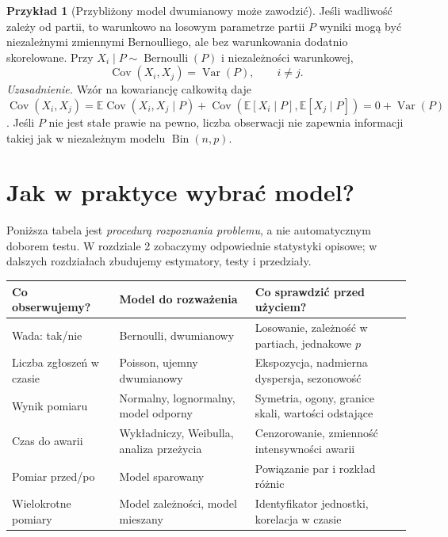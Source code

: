 \documentclass[11pt,a4paper,oneside]{report}
\numberwithin{equation}{chapter}
\theoremstyle{plain}
\theoremstyle{definition}
\newtheorem{przyklad}{Przykład}[chapter]
\theoremstyle{remark}
\newcommand{\E}{\mathbb E}
\newcommand{\Var}{\operatorname{Var}}
\newcommand{\Cov}{\operatorname{Cov}}
\DeclareMathOperator{\Bin}{Bin}
\begin{document}
\begin{przyklad}[Przybliżony model dwumianowy może zawodzić]
Jeśli wadliwość zależy od partii, to warunkowo na losowym parametrze partii $P$ wyniki mogą być niezależnymi zmiennymi Bernoulliego, ale bez warunkowania dodatnio skorelowane. Przy $X_i\mid P\sim\operatorname{Bernoulli}(P)$ i niezależności warunkowej,
\[
\Cov(X_i,X_j)=\Var(P),\qquad i\neq j.
\]
\emph{Uzasadnienie.} Wzór na kowariancję całkowitą daje $\Cov(X_i,X_j)=\E\Cov(X_i,X_j\mid P)+\Cov(\E[X_i\mid P],\E[X_j\mid P])=0+\Var(P)$. Jeśli $P$ nie jest stałe prawie na pewno, liczba obserwacji nie zapewnia informacji takiej jak w niezależnym modelu $\Bin(n,p)$.
\end{przyklad}

\section{Jak w praktyce wybrać model?}
Poniższa tabela jest \emph{procedurą rozpoznania problemu}, a nie automatycznym doborem testu. W rozdziale 2 zobaczymy odpowiednie statystyki opisowe; w dalszych rozdziałach zbudujemy estymatory, testy i przedziały.

\begin{center}\small
\begin{tabular}{>{\raggedright\arraybackslash}p{}>{\raggedright\arraybackslash}p{}>{\raggedright\arraybackslash}p{}}
\toprule
\textbf{Co obserwujemy?} & \textbf{Model do rozważenia} & \textbf{Co sprawdzić przed użyciem?}\\
\midrule
Wada: tak/nie & Bernoulli, dwumianowy & Losowanie, zależność w partiach, jednakowe $p$\\
Liczba zgłoszeń w czasie & Poisson, ujemny dwumianowy & Ekspozycja, nadmierna dyspersja, sezonowość\\
Wynik pomiaru & Normalny, lognormalny, model odporny & Symetria, ogony, granice skali, wartości odstające\\
Czas do awarii & Wykładniczy, Weibulla, analiza przeżycia & Cenzorowanie, zmienność intensywności awarii\\
Pomiar przed/po & Model sparowany & Powiązanie par i rozkład różnic\\
Wielokrotne pomiary & Model zależności, model mieszany & Identyfikator jednostki, korelacja w czasie\\
\bottomrule
\end{tabular}
\end{center}
\end{document}
